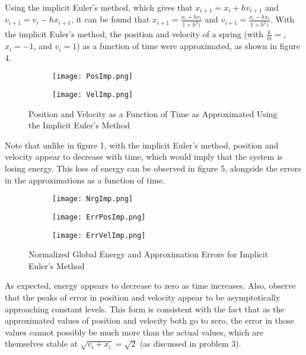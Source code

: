 \documentclass[10pt]{article}
\newenvironment{problem}[2][Problem]{\begin{trivlist}
\item[\hskip \labelsep {\bfseries #1}\hskip \labelsep {\bfseries #2.}]}{\end{trivlist}}
\begin{document}
\begin{problem} {5}
Using the implicit Euler's method, which gives that $x_{i+1}=x_i+hv_{i+1}$ and $v_{i+1}=v_i-hx_{i+1}$, it can be found that $x_{i+1}=\frac{x_i+hv_i}{1+h^2)}$ and $v_{i+1}=\frac{x_i-hx_i}{1+h^2)}$. With the implicit Euler's method, the position and velocity of a spring (with $\frac{k}{m}=$, $x_i=-1$, and $v_i=1$) as a function of time were approximated, as shown in figure 4.

\begin{figure}[h]
\centering
\begin{subfigure}{.45\textwidth}
  \centering
  \texttt{[image: PosImp.png]}
\end{subfigure}%
\begin{subfigure}{.45\textwidth}
  \centering
  \texttt{[image: VelImp.png]}
\end{subfigure}
\caption{Position and Velocity as a Function of Time as Approximated Using the Implicit Euler's Method}
\end{figure}

Note that unlike in figure 1, with the implicit Euler's method, position and velocity appear to decrease with time, which would imply that the system is losing energy. This loss of energy can be observed in figure 5, alongside the errors in the approximations as a function of time.

\begin{figure}[h]
\centering
\begin{subfigure}{.3\textwidth}
  \centering
  \texttt{[image: NrgImp.png]}
\end{subfigure}%
\begin{subfigure}{.3\textwidth}
  \centering
  \texttt{[image: ErrPosImp.png]}
\end{subfigure}
\begin{subfigure}{.3\textwidth}
  \centering
  \texttt{[image: ErrVelImp.png]}
\end{subfigure}
\caption{Normalized Global Energy and Approximation Errors for Implicit Euler's Method}
\end{figure}

As expected, energy appears to decrease to zero as time increases. Also, observe that the peaks of error in position and velocity appear to be asymptotically approaching constant levels. This form is consistent with the fact that as the approximated values of position and velocity both go to zero, the error in those values cannot possibly be much more than the actual values, which are themselves stable at $\sqrt{v_i+x_i}=\sqrt{2}$ (as discussed in problem 3).
\end{problem}
\newpage
\end{document}
